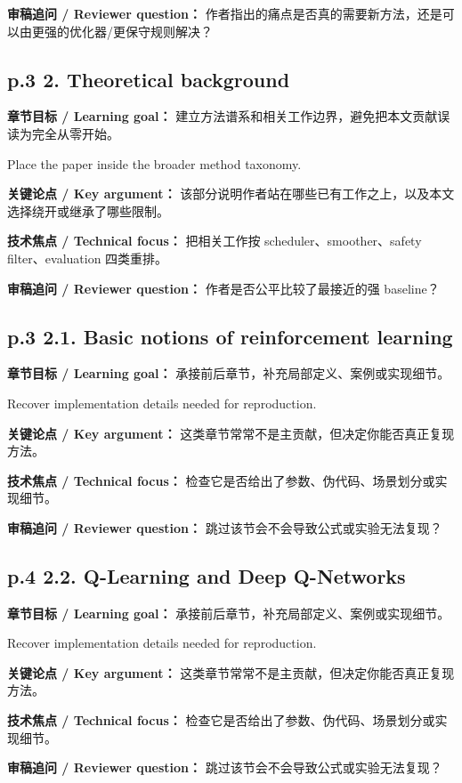 \documentclass[UTF8,a4paper,11pt,fontset=fandol]{ctexart}
\begin{document}
\textbf{审稿追问 / Reviewer question：} 作者指出的痛点是否真的需要新方法，还是可以由更强的优化器/更保守规则解决？

\subsection*{p.3 2. Theoretical background}
\textbf{章节目标 / Learning goal：} 建立方法谱系和相关工作边界，避免把本文贡献误读为完全从零开始。

Place the paper inside the broader method taxonomy.

\textbf{关键论点 / Key argument：} 该部分说明作者站在哪些已有工作之上，以及本文选择绕开或继承了哪些限制。

\textbf{技术焦点 / Technical focus：} 把相关工作按 scheduler、smoother、safety filter、evaluation 四类重排。

\textbf{审稿追问 / Reviewer question：} 作者是否公平比较了最接近的强 baseline？

\subsection*{p.3 2.1. Basic notions of reinforcement learning}
\textbf{章节目标 / Learning goal：} 承接前后章节，补充局部定义、案例或实现细节。

Recover implementation details needed for reproduction.

\textbf{关键论点 / Key argument：} 这类章节常常不是主贡献，但决定你能否真正复现方法。

\textbf{技术焦点 / Technical focus：} 检查它是否给出了参数、伪代码、场景划分或实现细节。

\textbf{审稿追问 / Reviewer question：} 跳过该节会不会导致公式或实验无法复现？

\subsection*{p.4 2.2. Q-Learning and Deep Q-Networks}
\textbf{章节目标 / Learning goal：} 承接前后章节，补充局部定义、案例或实现细节。

Recover implementation details needed for reproduction.

\textbf{关键论点 / Key argument：} 这类章节常常不是主贡献，但决定你能否真正复现方法。

\textbf{技术焦点 / Technical focus：} 检查它是否给出了参数、伪代码、场景划分或实现细节。

\textbf{审稿追问 / Reviewer question：} 跳过该节会不会导致公式或实验无法复现？
\end{document}
